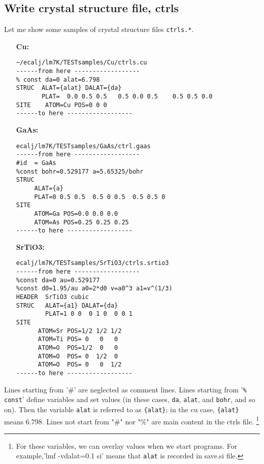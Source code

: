 \documentclass[a4paper,10pt,epsf,fleqn]{article}
\begin{document}
\subsection{Write crystal structure file, ctrls}
\label{ctrls}
Let me show some samples of crystal structure files \verb+ctrls.*+. 
\begin{itemize}
\item[\bf Cu:]
\begin{verbatim}
~/ecalj/lm7K/TESTsamples/Cu/ctrls.cu
------from here ------------------
% const da=0 alat=6.798
STRUC  ALAT={alat} DALAT={da}
       PLAT=  0.0 0.5 0.5   0.5 0.0 0.5    0.5 0.5 0.0
SITE    ATOM=Cu POS=0 0 0
------to here ------------------
\end{verbatim}

\item[\bf GaAs:]
\begin{verbatim}
ecalj/lm7K/TESTsamples/GaAs/ctrl.gaas
------from here ------------------
#id  = GaAs
%const bohr=0.529177 a=5.65325/bohr 
STRUC
     ALAT={a} 
     PLAT=0 0.5 0.5  0.5 0 0.5  0.5 0.5 0 
SITE
     ATOM=Ga POS=0.0 0.0 0.0
     ATOM=As POS=0.25 0.25 0.25
------to here ------------------
\end{verbatim}
\item[\bf SrTiO3:]
\begin{verbatim}
ecalj/lm7K/TESTsamples/SrTiO3/ctrls.srtio3 
------from here ------------------
%const da=0 au=0.529177
%const d0=1.95/au a0=2*d0 v=a0^3 a1=v^(1/3)
HEADER  SrTiO3 cubic 
STRUC   ALAT={a1} DALAT={da} 
        PLAT=1 0 0  0 1 0  0 0 1
SITE
      ATOM=Sr POS=1/2 1/2 1/2
      ATOM=Ti POS= 0   0   0
      ATOM=O  POS=1/2  0   0
      ATOM=O  POS= 0  1/2  0
      ATOM=O  POS= 0   0  1/2
------to here ------------------
\end{verbatim}
\end{itemize}

Lines starting from '\#' are neglected as comment lines.
Lines starting from '\verb+% const+' define variables and set values
(in these cases, \verb+da+, \verb+alat+, and \verb+bohr+, and so on). 
Then the variable \verb+alat+ is referred to as \verb+{alat}+; in the cu case,
\verb+{alat}+ means 6.798.
Lines not start from "\#" nor "\%" are main content in the ctrls file.
\footnote{For these variables, we can overlay values when we start
programs. For example,'lmf -vdalat=0.1 si' means that \texttt{alat} is recorded in save.si file.}
\end{document}
